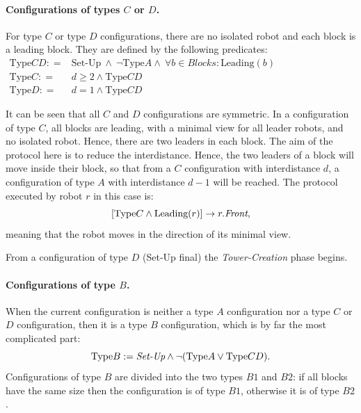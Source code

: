 \paragraph{Configurations of types $C$ or $D$.}
For type $C$ or type $D$ configurations, there are no isolated robot
and each block is a leading block. They are defined by the following
predicates: \\
$ \begin{array}{ll}
  \text{Type}CD: = & \text{Set-Up} \ \wedge  \ \neg \text{Type}A \wedge \ \forall b \in \textit{Blocks}: \textrm{Leading}(b)\\
  \text{Type}C: = & d \geq 2 \wedge \text{Type}CD \\
  \text{Type}D: = & d = 1 \wedge \text{Type}CD\end{array}$

It can be seen that all $C$ and $D$ configurations are symmetric.
In a configuration of type $C$, all blocks are leading, with a minimal
view for all leader robots, and no isolated robot. Hence, there are
two leaders in each block. The aim of the protocol here is to reduce
the interdistance. Hence, the two leaders of a block will move inside
their block, so that from a $C$ configuration with interdistance $d$, 
a configuration of type $A$ with interdistance $d-1$ will be reached.
The protocol executed by robot $r$ in this case is: 
$$[\text{Type}C \wedge \textrm{Leading}(r)] \rightarrow r.\textit{Front}, $$
meaning that the robot moves in the direction of its minimal view.

From a configuration of type $D$ (Set-Up final) the
\emph{Tower-Creation} phase begins. 


\paragraph{Configurations of type $B$.}
When the current configuration is neither a type $A$ configuration nor
a type $C$ or $D$ configuration, then it is a type $B$ configuration, 
which is by far the most complicated part: 
$$\text{Type}B: = \emph{Set-Up} \wedge \neg (\text{Type}A \vee \text{Type}CD).$$
Configurations of type $B$ are divided into the two types $B1$ and
$B2$: if all blocks have the same size then the configuration is of
type $B1$, otherwise it is of type $B2$.  


